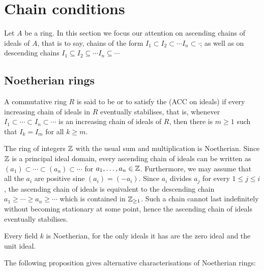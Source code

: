
\section{Chain conditions}

Let $A$ be a ring. In this section we focus our attention on ascending chains of ideals of $A$, that is to say, chains of the form $I_1 \subset I_2 \subset \cdots I_n \subset \cdot$; as well as on descending chains $I_1 \subseteq I_2 \subseteq \cdots I_n \subseteq \cdots $

\subsection{Noetherian rings}

\begin{definition}
	A commutative ring $R$ is said to be  or to satisfy the  (ACC on ideals) if every increasing chain of ideals in $R$ eventually stabilises, that is, whenever $I_1 \subset \cdots \subset I_n \subset \cdots$ is an increasing chain of ideals of $R$, then there is $m \geq 1$ such that $I_k = I_m$ for all $k \geq m$.
\end{definition}

\begin{example}
	The ring of integers $\mathbb{Z}$ with the usual sum and multiplication is Noetherian. Since $\mathbb{Z}$ is a principal ideal domain, every ascending chain of ideals can be written as $(a_1) \subset \cdots \subset (a_n) \subset \cdots$ for $a_1, \ldots, a_n \in \mathbb{Z}$. Furthermore, we may assume that all the $a_i$ are positive sine $(a_i) = (-a_i)$. Since $a_i$ divides $a_j$ for every $1 \leq j \leq i$, the ascending chain of ideals is equivalent to the descending chain $a_1 \geq \cdots \geq a_n \geq \cdots$ which is contained in $\mathbb{Z}_{\geq 1}$. Such a chain cannot last indefinitely without becoming stationary at some point, hence the ascending chain of ideals eventually stabilises.
\end{example}

\begin{example}
	Every field $k$ is Noetherian, for the only ideals it has are the zero ideal and the unit ideal.
\end{example}

The following proposition gives alternative characterisations of Noetherian rings:

